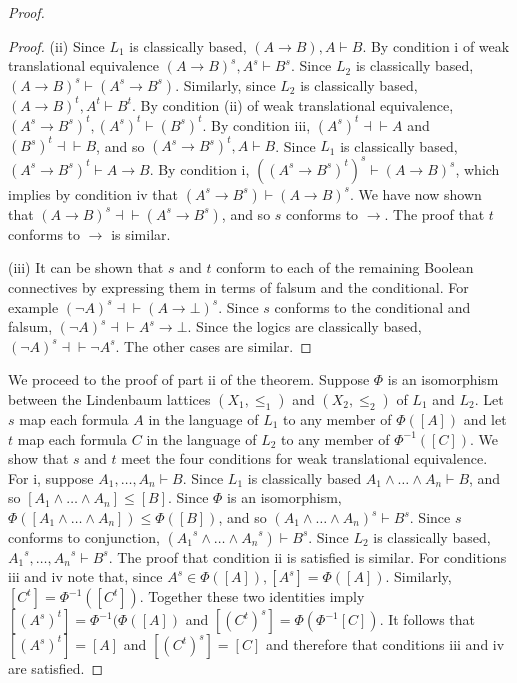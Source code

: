 \begin{proof}
\begin{proof}
(ii) Since $L_1$ is classically based, $(A\rightarrow B),A \vdash B$. By condition i of weak translational equivalence 
$(A\rightarrow B)^s, A^s \vdash B^s$. Since $L_2$ is classically based, $(A\rightarrow B)^s \vdash (A^s\rightarrow B^s)$. Similarly, since $L_2$ is classically based, 
$(A\rightarrow B)^t,A^t \vdash B^t$. By condition (ii) of weak translational equivalence, $(A^s\rightarrow B^s)^t,(A^s)^t \vdash (B^s)^t$. By condition iii, $(A^s)^t {\dashv}{\vdash}A$ and $(B^s)^t {\dashv}{\vdash}B$, and so $(A^s\rightarrow B^s)^t,A \vdash B$. Since $L_1$ is classically based, 
$(A^s\rightarrow B^s)^t \vdash A\rightarrow B$. By condition i, $((A^s\rightarrow B^s)^t)^s \vdash (A\rightarrow B)^s$, which implies by condition iv that $(A^s\rightarrow B^s) \vdash (A\rightarrow B)^s$. We have now shown that $(A\rightarrow B)^s{\dashv}{\vdash}(A^s\rightarrow B^s)$, and so $s$ conforms to $\rightarrow $. The proof that $t$ conforms to $\rightarrow $ is similar.

(iii) It can be shown that $s$ and $t$ conform to each of the remaining Boolean connectives by expressing them in terms of falsum and the conditional. For example $(\neg A)^s {\dashv}{\vdash} (A\rightarrow \bot)^s$. Since $s$ conforms to the conditional and falsum, $(\neg A)^s {\dashv}{\vdash} A^s \rightarrow \bot$. Since the logics are classically based, 
$(\neg A)^s {\dashv}{\vdash} \neg A^s$. The other cases are similar.
\end{proof}
We proceed to the proof of part ii of the theorem. Suppose $\Phi$ is an isomorphism between the Lindenbaum lattices $(X_1,\le _1)$ and $(X_2,\le _2)$ of $L_1$ and $L_2$. Let $s$ map each formula $A$ in the language of $L_1$ to any member of $\Phi([A])$ and let $t$ map each formula $C$ in the language of $L_2$ to any member of $\Phi^{-1}([C])$. We show that $s$ and $t$ meet the four conditions for weak translational equivalence. 
For i, suppose $A_1,{\ldots},A_n \vdash B$. Since $L_1$ is classically based $A_1\wedge {\ldots}\wedge A_n \vdash B$, and so $[A_1\wedge {\ldots}\wedge A_n] \le [B]$. Since $\Phi$ is an isomorphism, $\Phi([A_1\wedge {\ldots}\wedge A_n]) \le \Phi([B])$, and so $(A_1\wedge {\ldots}\wedge A_n)^s \vdash B^s$. Since $s$ conforms to conjunction, $({A_1}^s\wedge {\ldots}\wedge {A_n}^s) \vdash B^s$. Since $L_2$ is classically based, ${A_1}^s,{\ldots},{A_n}^s \vdash B^s$. The proof that condition ii is satisfied is similar. For conditions iii and iv note that, since $A^s \in \Phi([A]), [A^s]= \Phi([A])$. Similarly, $[C^t]= \Phi^{-1}([C^t])$. Together these two identities imply $[(A^s)^t] = \Phi^{-1}(\Phi([A])$ and $[(C^t)^s]= \Phi(\Phi^{-1}[C])$. It follows that $[(A^s)^t] = [A]$ and $[(C^t)^s]=[C]$ and therefore that conditions iii and iv are satisfied. 
\end{proof}
